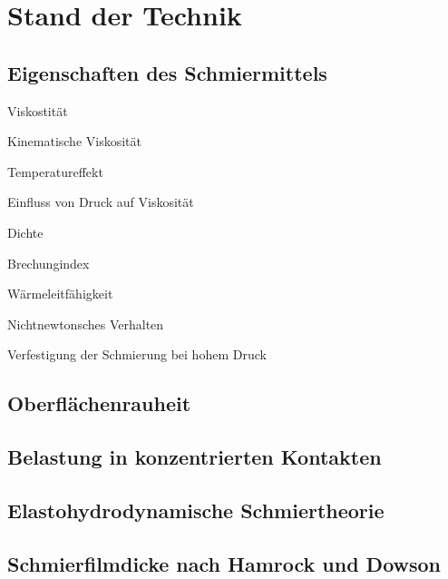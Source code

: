 \chapter{Stand der Technik}
\label{chap:stand_der_technik}

\section{Eigenschaften des Schmiermittels}
\label{sec:eigenschaften_des_schmiermittels}

Viskostität

Kinematische Viskosität

Temperatureffekt

Einfluss von Druck auf Viskosität

Dichte

Brechungindex

Wärmeleitfähigkeit

Nichtnewtonsches Verhalten

Verfestigung der Schmierung bei hohem Druck

\section{Oberflächenrauheit}
\label{sec:oberflaechenrauheit}

\section{Belastung in konzentrierten Kontakten}
\label{sec:belastung_in_konzentrierten_kontakten}

\section{Elastohydrodynamische Schmiertheorie}
\label{sec:elastohydrodynamische_schmiertheorie}


\section{Schmierfilmdicke nach Hamrock und Dowson}
\label{sec:schmierfilmdicke_nach_hamrock_und_dowson}


